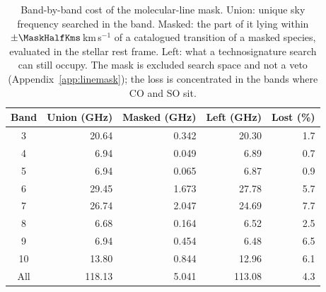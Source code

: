 \begin{table}
\centering
\footnotesize
\setlength{\tabcolsep}{4pt}
\caption{Band-by-band cost of the molecular-line mask. Union: unique sky frequency searched in the band. Masked: the part of it lying within $\pm\MaskHalfKms$\,km\,s$^{-1}$ of a catalogued transition of a masked species, evaluated in the stellar rest frame. Left: what a technosignature search can still occupy. The mask is excluded search space and not a veto (Appendix~\ref{app:linemask}); the loss is concentrated in the bands where CO and SO sit.}
\label{tab:maskband}
\begin{tabular}{@{}crrrr@{}}
\hline
Band & Union (GHz) & Masked (GHz) & Left (GHz) & Lost (\%) \\
\hline
3 & 20.64 & 0.342 & 20.30 & 1.7 \\
4 & 6.94 & 0.049 & 6.89 & 0.7 \\
5 & 6.94 & 0.065 & 6.87 & 0.9 \\
6 & 29.45 & 1.673 & 27.78 & 5.7 \\
7 & 26.74 & 2.047 & 24.69 & 7.7 \\
8 & 6.68 & 0.164 & 6.52 & 2.5 \\
9 & 6.94 & 0.454 & 6.48 & 6.5 \\
10 & 13.80 & 0.844 & 12.96 & 6.1 \\
\hline
All & 118.13 & 5.041 & 113.08 & 4.3 \\
\hline
\end{tabular}
\end{table}
